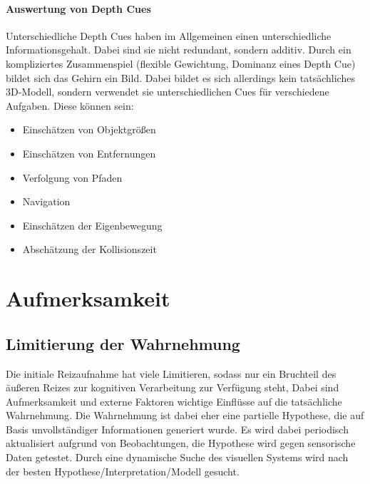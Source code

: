 				\paragraph{Auswertung von Depth Cues}
					Unterschiedliche Depth Cues haben im Allgemeinen einen unterschiedliche Informationsgehalt. Dabei sind sie nicht redundant, sondern additiv. Durch ein kompliziertes Zusammenspiel (flexible Gewichtung, Dominanz eines Depth Cue) bildet sich das Gehirn ein Bild. Dabei bildet es sich allerdings kein tatsächliches 3D-Modell, sondern verwendet sie unterschiedlichen Cues für verschiedene Aufgaben. Diese können \zB sein:
					\begin{itemize}
						\item Einschätzen von Objektgrößen
						\item Einschätzen von Entfernungen
						\item Verfolgung von Pfaden
						\item Navigation
						\item Einschätzen der Eigenbewegung
						\item Abschätzung der Kollisionszeit
					\end{itemize}

	\section{Aufmerksamkeit}
		\subsection{Limitierung der Wahrnehmung}
			Die initiale Reizaufnahme hat viele Limitieren, sodass nur ein Bruchteil des äußeren Reizes zur kognitiven Verarbeitung zur Verfügung steht, Dabei sind Aufmerksamkeit und externe Faktoren wichtige Einflüsse auf die tatsächliche Wahrnehmung. Die Wahrnehmung ist dabei eher eine partielle Hypothese, die auf Basis unvollständiger Informationen generiert wurde. Es wird dabei periodisch aktualisiert aufgrund von Beobachtungen, \dh die Hypothese wird gegen sensorische Daten getestet. Durch eine dynamische Suche des visuellen Systems wird nach der besten Hypothese/Interpretation/Modell gesucht.

